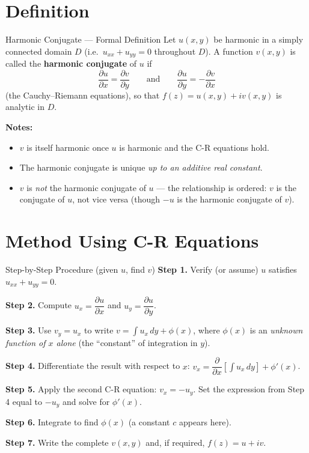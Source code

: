 \documentclass[12pt,a4paper]{article}
\begin{document}
\section{Definition}

\begin{infobox}{Harmonic Conjugate --- Formal Definition}
Let $u(x,y)$ be harmonic in a simply connected domain $D$ (i.e.\
$u_{xx}+u_{yy}=0$ throughout $D$). A function $v(x,y)$ is called the
\textbf{harmonic conjugate} of $u$ if
\[
  \frac{\partial u}{\partial x}=\frac{\partial v}{\partial y}
  \qquad\text{and}\qquad
  \frac{\partial u}{\partial y}=-\frac{\partial v}{\partial x}
\]
(the Cauchy--Riemann equations), so that $f(z)=u(x,y)+iv(x,y)$ is analytic in $D$.

\medskip
\textbf{Notes:}
\begin{itemize}[leftmargin=1.5em]
  \item $v$ is itself harmonic once $u$ is harmonic and the C-R equations hold.
  \item The harmonic conjugate is unique \emph{up to an additive real constant}.
  \item $v$ is \emph{not} the harmonic conjugate of $u$ --- the relationship is
        ordered: $v$ is the conjugate of $u$, not vice versa (though $-u$ is the
        harmonic conjugate of $v$).
\end{itemize}
\end{infobox}

\section{Method Using C-R Equations}

\begin{infobox}{Step-by-Step Procedure (given $u$, find $v$)}
\textbf{Step 1.} Verify (or assume) $u$ satisfies $u_{xx}+u_{yy}=0$.

\textbf{Step 2.} Compute $u_x = \dfrac{\partial u}{\partial x}$ and
                               $u_y = \dfrac{\partial u}{\partial y}$.

\textbf{Step 3.} Use $v_y = u_x$ to write $v = \displaystyle\int u_x\,dy + \phi(x)$,
where $\phi(x)$ is an \emph{unknown function of $x$ alone} (the ``constant'' of integration
in $y$).

\textbf{Step 4.} Differentiate the result with respect to $x$:
$v_x = \dfrac{\partial}{\partial x}\!\left[\int u_x\,dy\right] + \phi'(x)$.

\textbf{Step 5.} Apply the second C-R equation: $v_x = -u_y$.
Set the expression from Step 4 equal to $-u_y$ and solve for $\phi'(x)$.

\textbf{Step 6.} Integrate to find $\phi(x)$ (a constant $c$ appears here).

\textbf{Step 7.} Write the complete $v(x,y)$ and, if required, $f(z)=u+iv$.
\end{infobox}
\end{document}
